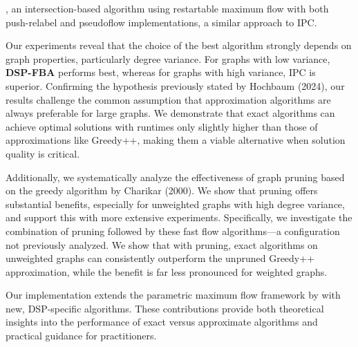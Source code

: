 \textbf{{\DSPwithR}}, an intersection-based algorithm using restartable maximum flow with both push-relabel and pseudoflow implementations, a similar approach to IPC.

Our experiments reveal that the choice of the best algorithm strongly depends on graph properties, particularly degree variance.
For graphs with low variance, \textbf{DSP-FBA} performs best, whereas for graphs with high variance, IPC is superior.
Confirming the hypothesis previously stated by Hochbaum (2024), our results challenge the common assumption that approximation algorithms are always preferable for large graphs.
We demonstrate that exact algorithms can achieve optimal solutions with runtimes only slightly higher than those of approximations like Greedy++,
making them a viable alternative when solution quality is critical.

Additionally, we systematically analyze the effectiveness of graph pruning based on the greedy algorithm by Charikar (2000).
We show that pruning offers substantial benefits, especially for unweighted graphs with high degree variance, and support this with more extensive experiments.
Specifically, we investigate the combination of pruning followed by these fast flow algorithms—a configuration not previously analyzed.
We show that with pruning, exact algorithms on unweighted graphs can consistently outperform the unpruned Greedy++ approximation, while the benefit is far less pronounced for weighted graphs.



Our implementation extends the parametric maximum flow framework by \textcite{beines_simpler_2024} with new, DSP-specific algorithms.
These contributions provide both theoretical insights into the performance of exact versus approximate algorithms and practical guidance for practitioners.



